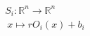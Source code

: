 \documentclass[preview]{standalone}
\begin{document}
\begin{align*}
S_i : \mathbb{R}^n \to \mathbb{R}^n \\ \ x \mapsto r O_i(x) + b_i \\
\end{align*}
\end{document}
